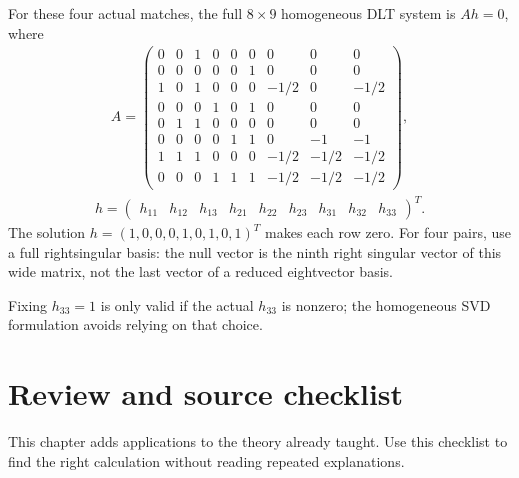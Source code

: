 \documentclass[letterpaper,11pt,english,openany,oneside]{jupyterBook}
\begin{document}
\sphinxAtStartPar
For these four actual matches, the full {\color{QuizMathBlue} \(8\times9\)} homogeneous DLT system is {\color{QuizMathBlue} \(Ah=0\)}, where
{\color{QuizMathBlue} \begin{equation*}
\begin{split}
A=\begin{pmatrix}
0&0&1&0&0&0&0&0&0\\0&0&0&0&0&1&0&0&0\\
1&0&1&0&0&0&-1/2&0&-1/2\\0&0&0&1&0&1&0&0&0\\
0&1&1&0&0&0&0&0&0\\0&0&0&0&1&1&0&-1&-1\\
1&1&1&0&0&0&-1/2&-1/2&-1/2\\0&0&0&1&1&1&-1/2&-1/2&-1/2
\end{pmatrix},
\end{split}
\end{equation*}}{\color{QuizMathBlue} \begin{equation*}
\begin{split}
h=\begin{pmatrix}h_{11}&h_{12}&h_{13}&h_{21}&h_{22}&h_{23}&h_{31}&h_{32}&h_{33}\end{pmatrix}^T.
\end{split}
\end{equation*}}
\sphinxAtStartPar
The solution {\color{QuizMathBlue} \(h=(1,0,0,0,1,0,1,0,1)^T\)} makes each row zero. For four pairs, use a full right\sphinxhyphen{}singular basis: the null vector is the ninth right singular vector of this wide matrix, not the last vector of a reduced eight\sphinxhyphen{}vector basis.

\par

\sphinxAtStartPar
{} Fixing \(h_{33}=1\) is only valid if the actual \(h_{33}\) is nonzero; the homogeneous SVD formulation avoids relying on that choice.

\sphinxstepscope


\section{Review and source checklist}
\label{\detokenize{lectures/lecture03/review:review-and-source-checklist}}\label{\detokenize{lectures/lecture03/review:lec03-review}}\label{\detokenize{lectures/lecture03/review::doc}}
\sphinxAtStartPar
This chapter adds applications to the theory already taught. Use this checklist to find the right calculation without reading repeated explanations.
\end{document}
